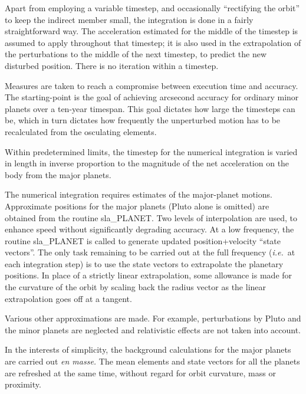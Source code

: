 \documentclass[11pt,twoside]{article}
\begin{document}
{\begin{enumerate}
        Apart from employing a variable timestep, and occasionally
        ``rectifying the orbit'' to keep the indirect member small, the
        integration is done in a fairly straightforward way.  The
        acceleration estimated for the middle of the timestep is assumed
        to apply throughout that timestep;  it is also used in the
        extrapolation of the perturbations to the middle of the next
        timestep, to predict the new disturbed position.  There is no
        iteration within a timestep.

        Measures are taken to reach a compromise between execution time
        and accuracy.  The starting-point is the goal of achieving
        arcsecond accuracy for ordinary minor planets over a ten-year
        timespan.  This goal dictates how large the timesteps can be,
        which in turn dictates how frequently the unperturbed motion has
        to be recalculated from the osculating elements.

        Within predetermined limits, the timestep for the numerical
        integration is varied in length in inverse proportion to the
        magnitude of the net acceleration on the body from the major
        planets.

        The numerical integration requires estimates of the major-planet
        motions.  Approximate positions for the major planets (Pluto
        alone is omitted) are obtained from the routine sla\_PLANET.  Two
        levels of interpolation are used, to enhance speed without
        significantly degrading accuracy.  At a low frequency, the routine
        sla\_PLANET is called to generate updated position+velocity ``state
        vectors''.  The only task remaining to be carried out at the full
        frequency ({\it i.e.}\ at each integration step) is to use the state
        vectors to extrapolate the planetary positions.  In place of a
        strictly linear extrapolation, some allowance is made for the
        curvature of the orbit by scaling back the radius vector as the
        linear extrapolation goes off at a tangent.

        Various other approximations are made.  For example, perturbations
        by Pluto and the minor planets are neglected and relativistic
        effects are not taken into account.

        In the interests of simplicity, the background calculations for
        the major planets are carried out {\it en masse.}
        The mean elements and
        state vectors for all the planets are refreshed at the same time,
        without regard for orbit curvature, mass or proximity.


\end{enumerate}}
\end{document}
